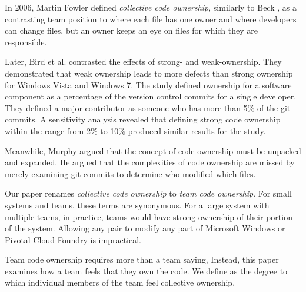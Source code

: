 In 2006, Martin Fowler defined \textit{collective code ownership}, similarly to Beck \cite{FowlerCodeOwnership}, as a contrasting team position to  where each file has one owner and  where developers can change files, but an owner keeps an eye on files for which they are responsible. 

Later, Bird et al. \cite{BirdDontTouchMyCode} contrasted the effects of strong- and weak-ownership. They demonstrated that weak ownership leads to more defects than strong ownership for Windows Vista and Windows 7. The study defined ownership for a software component as a percentage of the version control commits for a single developer. They defined a major contributor as someone who has more than 5\% of the git commits. A sensitivity analysis revealed that defining strong code ownership within the range from 2\% to 10\% produced similar results for the study.

Meanwhile, Murphy  \cite{MurphyIEEESoftware} argued that the concept of code ownership must be unpacked and expanded. He argued that the complexities of code ownership are missed by merely examining git commits to determine who modified which files.

Our paper renames \textit{collective code ownership} to \textit{team code ownership}. For small systems and teams, these terms are synonymous. For a large system with multiple teams, in practice, teams would have strong ownership of their portion of the system. Allowing any pair to modify any part of Microsoft Windows or Pivotal Cloud Foundry is impractical.

Team code ownership requires more than a team saying,  Instead, this paper examines how a team feels that they own the code. We define  as the degree to which individual members of the team feel collective ownership.  


